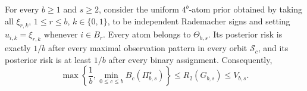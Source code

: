 For every \(b\geq 1\) and \(s\geq 2\), consider the uniform \(4^b\)-atom prior obtained by taking all \(\xi_{r,k}\), \(1\leq r\leq b\), \(k\in\{0,1\}\), to be independent Rademacher signs and setting \(u_{i,k}=\xi_{r,k}\) whenever \(i\in B_r\). Every atom belongs to \(\Theta_{b,s}\). Its posterior risk is exactly \(1/b\) after every maximal observation pattern in every orbit \(\mathcal S_c\), and its posterior risk is at least \(1/b\) after every binary assignment. Consequently,
\[
\max\left\{\frac1b,\min_{0\leq c\leq b}B_c(\Pi_{b,s}^{\star})\right\}
\leq R_2(G_{b,s})\leq V_{b,s}.
\]